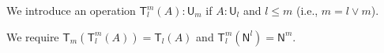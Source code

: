 \documentclass[11pt,a4paper]{article}
\theoremstyle{definition}
\newcommand{\NN}{\mathsf{N}}
\newcommand{\UU}{\mathsf{U}}
\newcommand{\mylam}[3]{\lambda_{#1:#2}#3}
\newcommand{\mypi}[3]{\Pi_{#1:#2}#3}
\newcommand{\mysig}[3]{\Sigma_{#1:#2}#3}
\newcommand{\T}{\mathsf{T}}
\begin{document}



We introduce an operation $\T_{l}^{m}(A):\UU_{m}$ if $A:\UU_{l}$
and $l\leqslant m$ (i.e., $m = l\vee m$).

We require $\T_{m}(\T_{l}^{m}(A)) = \T_{l}(A)$
and $\T_{l}^{m}(\NN^{l}) = \NN^{m}$.
\end{document}
